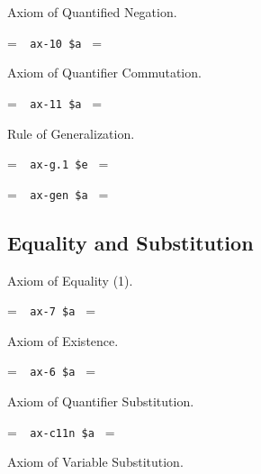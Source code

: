 \noindent Axiom of Quantified Negation.

\setbox\startprefix=\hbox{\tt \ \ ax-10\ \$a\ }
\setbox\contprefix=\hbox{\tt \ \ \ \ \ \ \ \ \ \ }
\startm
\m{\vdash}\m{(}\m{\lnot}\m{\forall}\m{\lnot}\m{\forall}\m{\varphi}\m{
\rightarrow}\m{\varphi}\m{)}
\endm

\noindent Axiom of Quantifier Commutation.

\setbox\startprefix=\hbox{\tt \ \ ax-11\ \$a\ }
\setbox\contprefix=\hbox{\tt \ \ \ \ \ \ \ \ \ \ }
\startm
\m{\vdash}\m{(}\m{\forall}\m{\forall}\m{\varphi}\m{\rightarrow}\m{
\forall}\m{\forall}\m{\varphi}\m{)}
\endm


\noindent Rule of Generalization.

\setbox\startprefix=\hbox{\tt \ \ ax-g.1\ \$e\ }
\setbox\contprefix=\hbox{\tt \ \ \ \ \ \ \ \ \ \ \ \ }
\startm
\m{\vdash}\m{\varphi}
\endm

\setbox\startprefix=\hbox{\tt \ \ ax-gen\ \$a\ }
\setbox\contprefix=\hbox{\tt \ \ \ \ \ \ \ \ \ \ \ \ }
\startm
\m{\vdash}\m{\forall}\m{\varphi}
\endm


\subsection{Equality and Substitution}

\noindent Axiom of Equality (1).

\setbox\startprefix=\hbox{\tt \ \ ax-7\ \$a\ }
\setbox\contprefix=\hbox{\tt \ \ \ \ \ \ \ \ \ \ }
\startm
\m{\vdash}\m{(}\m{=}\m{\rightarrow}\m{(}\m{=}\m{
\rightarrow}\m{=}\m{)}\m{)}
\endm

\noindent Axiom of Existence.

\setbox\startprefix=\hbox{\tt \ \ ax-6\ \$a\ }
\setbox\contprefix=\hbox{\tt \ \ \ \ \ \ \ \ \ \ }
\startm
\m{\vdash}\m{(}\m{\forall}\m{(}\m{=}\m{\rightarrow}\m{\forall}
\m{\varphi}\m{)}\m{\rightarrow}\m{\varphi}\m{)}
\endm

\noindent Axiom of Quantifier Substitution.

\setbox\startprefix=\hbox{\tt \ \ ax-c11n\ \$a\ }
\setbox\contprefix=\hbox{\tt \ \ \ \ \ \ \ \ \ \ \ }
\startm
\m{\vdash}\m{(}\m{\forall}\m{=}\m{\rightarrow}\m{(}\m{\forall}
\m{\varphi}\m{\rightarrow}\m{\forall}\m{\varphi}\m{)}\m{)}
\endm


\noindent Axiom of Variable Substitution.

